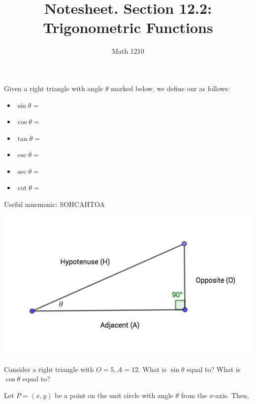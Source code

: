 \documentclass[12pt, a4paper]{article}
\author{Math 1210}
\title{Notesheet. Section 12.2: Trigonometric Functions}
\date{}
\begin{document}
\maketitle
\nameline
\begin{defi}
  Given a right triangle with angle \(\theta\) marked below, we define
  our  as follows:\\
  \begin{minipage}{0.5\linewidth}
    \begin{itemize}
    \item \(\sin \theta =\)
    \item \(\cos \theta =\)
    \item \(\tan \theta =\)
    \item \(\csc \theta =\)
    \item \(\sec \theta =\)
    \item \(\cot \theta =\)
    \end{itemize}
    Useful mnemonic: SOHCAHTOA
  \end{minipage}
  \begin{minipage}{0.5\linewidth}
  \includegraphics[scale=0.5]{images/right-triangle}    
  \end{minipage}
\end{defi}
\vspace{-0.3in}
\begin{ex}
  Consider a right triangle with \(O = 5, A = 12\). What is \(\sin
  \theta\) equal to? What is \(\cos \theta\) equal to?
\end{ex}
\vspace{-0.5in}
\hspace{-0.25in}\begin{minipage}{0.8\linewidth}
\begin{thrm}
  Let \(P=(x,y)\) be a point on the unit circle with angle \(\theta\)
  from the \(x\)-axis. Then, \\
\end{thrm}  
\end{minipage}
\end{document}
